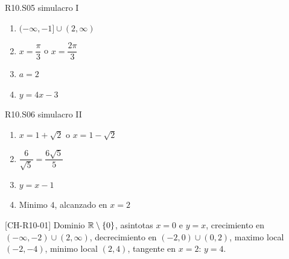 \begin{shortanswer}{R10.S05 simulacro I}
\begin{enumerate}[label=\textbf{SM-R10.S05-\arabic*:}, leftmargin=*]
  \item \((-\infty,-1]\cup(2,\infty)\)
  \item \(x=\dfrac{\pi}{3}\) o \(x=\dfrac{2\pi}{3}\)
  \item \(a=2\)
  \item \(y=4x-3\)
\end{enumerate}
\end{shortanswer}

\begin{shortanswer}{R10.S06 simulacro II}
\begin{enumerate}[label=\textbf{SM-R10.S06-\arabic*:}, leftmargin=*]
  \item \(x=1+\sqrt{2}\) o \(x=1-\sqrt{2}\)
  \item \(\dfrac{6}{\sqrt{5}}=\dfrac{6\sqrt{5}}{5}\)
  \item \(y=x-1\)
  \item Minimo \(4\), alcanzado en \(x=2\)
\end{enumerate}
\end{shortanswer}

\begin{shortanswer}{[CH-R10-01]}
Dominio \(\mathbb{R}\setminus\{0\}\), asintotas \(x=0\) e \(y=x\), crecimiento en
\((-\infty,-2)\cup(2,\infty)\), decrecimiento en \((-2,0)\cup(0,2)\), maximo local
\((-2,-4)\), minimo local \((2,4)\), tangente en \(x=2\): \(y=4\).
\end{shortanswer}
